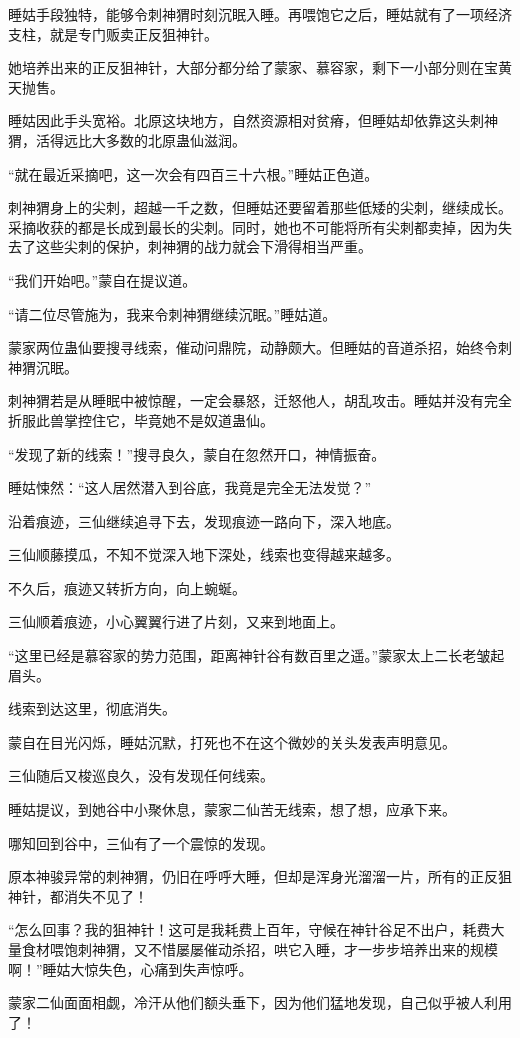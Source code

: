 \begin{this_body}
睡姑手段独特，能够令刺神猬时刻沉眠入睡。再喂饱它之后，睡姑就有了一项经济支柱，就是专门贩卖正反狙神针。

她培养出来的正反狙神针，大部分都分给了蒙家、慕容家，剩下一小部分则在宝黄天抛售。

睡姑因此手头宽裕。北原这块地方，自然资源相对贫瘠，但睡姑却依靠这头刺神猬，活得远比大多数的北原蛊仙滋润。

“就在最近采摘吧，这一次会有四百三十六根。”睡姑正色道。

刺神猬身上的尖刺，超越一千之数，但睡姑还要留着那些低矮的尖刺，继续成长。采摘收获的都是长成到最长的尖刺。同时，她也不可能将所有尖刺都卖掉，因为失去了这些尖刺的保护，刺神猬的战力就会下滑得相当严重。

“我们开始吧。”蒙自在提议道。

“请二位尽管施为，我来令刺神猬继续沉眠。”睡姑道。

蒙家两位蛊仙要搜寻线索，催动问鼎院，动静颇大。但睡姑的音道杀招，始终令刺神猬沉眠。

刺神猬若是从睡眠中被惊醒，一定会暴怒，迁怒他人，胡乱攻击。睡姑并没有完全折服此兽掌控住它，毕竟她不是奴道蛊仙。

“发现了新的线索！”搜寻良久，蒙自在忽然开口，神情振奋。

睡姑悚然：“这人居然潜入到谷底，我竟是完全无法发觉？”

沿着痕迹，三仙继续追寻下去，发现痕迹一路向下，深入地底。

三仙顺藤摸瓜，不知不觉深入地下深处，线索也变得越来越多。

不久后，痕迹又转折方向，向上蜿蜒。

三仙顺着痕迹，小心翼翼行进了片刻，又来到地面上。

“这里已经是慕容家的势力范围，距离神针谷有数百里之遥。”蒙家太上二长老皱起眉头。

线索到达这里，彻底消失。

蒙自在目光闪烁，睡姑沉默，打死也不在这个微妙的关头发表声明意见。

三仙随后又梭巡良久，没有发现任何线索。

睡姑提议，到她谷中小聚休息，蒙家二仙苦无线索，想了想，应承下来。

哪知回到谷中，三仙有了一个震惊的发现。

原本神骏异常的刺神猬，仍旧在呼呼大睡，但却是浑身光溜溜一片，所有的正反狙神针，都消失不见了！

“怎么回事？我的狙神针！这可是我耗费上百年，守候在神针谷足不出户，耗费大量食材喂饱刺神猬，又不惜屡屡催动杀招，哄它入睡，才一步步培养出来的规模啊！”睡姑大惊失色，心痛到失声惊呼。

蒙家二仙面面相觑，冷汗从他们额头垂下，因为他们猛地发现，自己似乎被人利用了！

\end{this_body}

